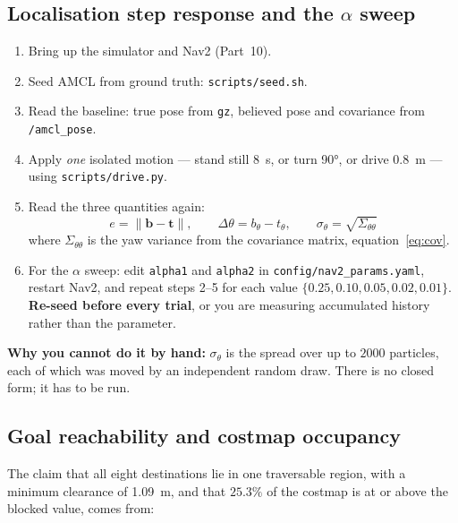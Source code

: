 \documentclass[11pt,a4paper]{report}
\newcommand{\file}[1]{\texttt{\small #1}}
\begin{document}
\subsection{Localisation step response and the $\alpha$ sweep}

\begin{plain}[Procedure]
\begin{enumerate}[leftmargin=1.6em,itemsep=2pt]
\item Bring up the simulator and Nav2 (Part~10).
\item Seed AMCL from ground truth: \file{scripts/seed.sh}.
\item Read the baseline: true pose from \file{gz}, believed pose and
covariance from \file{/amcl\_pose}.
\item Apply \emph{one} isolated motion --- stand still \SI{8}{\second}, or
turn \ang{90}, or drive \SI{0.8}{\metre} --- using \file{scripts/drive.py}.
\item Read the three quantities again:
\[
e = \lVert \mathbf{b} - \mathbf{t}\rVert,\qquad
\Delta\theta = b_\theta - t_\theta,\qquad
\sigma_\theta = \sqrt{\Sigma_{\theta\theta}}
\]
where $\Sigma_{\theta\theta}$ is the yaw variance from the covariance matrix,
equation~\eqref{eq:cov}.
\item For the $\alpha$ sweep: edit \file{alpha1} and \file{alpha2} in
\file{config/nav2\_params.yaml}, restart Nav2, and repeat steps 2--5 for each
value $\{0.25, 0.10, 0.05, 0.02, 0.01\}$. \textbf{Re-seed before every trial},
or you are measuring accumulated history rather than the parameter.
\end{enumerate}
\textbf{Why you cannot do it by hand:} $\sigma_\theta$ is the spread over up to
$2000$ particles, each of which was moved by an independent random draw. There
is no closed form; it has to be run.
\end{plain}

\subsection{Goal reachability and costmap occupancy}

The claim that all eight destinations lie in one traversable region, with a
minimum clearance of \SI{1.09}{\metre}, and that $25.3\%$ of the costmap is at
or above the blocked value, comes from:
\end{document}
